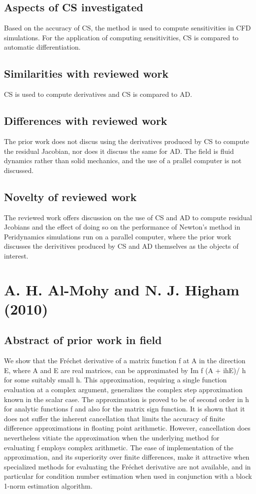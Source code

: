 \documentclass[10pt,letterpaper,draft]{article}
\begin{document}
\subsection{Aspects of CS investigated}
Based on the accuracy of CS, the method is used to compute sensitivities in CFD
simulations. For the application of computing sensitivities, CS is compared to 
automatic differentiation.

\subsection{Similarities with reviewed work}
CS is used to compute derivatives and CS is compared to AD.

\subsection{Differences with reviewed work}
The prior work does not discus using the derivatives produced by CS to compute
the residual Jacobian, nor does it discuss the same for AD. The field is
fluid dynamics rather than solid mechanics, and the use of a prallel computer
is not discussed.

\subsection{Novelty of reviewed work}

The reviewed work offers discussion on the use of CS and AD to compute
residual Jcobians and the effect of doing so on the performance of Newton's
method in Peridynamics simulations run on a parallel computer, where the prior
work discusses the derivitives produced by CS and AD themselves as the objects 
of interest.

\section{A. H. Al-Mohy and N. J. Higham (2010)}
\subsection{Abstract of prior work in field}

We show that the Fréchet derivative of a matrix function f at A in the
direction E, where A and E are real matrices, can be approximated by Im f (A +
ihE)/ h for some suitably small h. This approximation, requiring a single
function evaluation at a complex argument, generalizes the complex step
approximation known in the scalar case. The approximation is proved to be of
second order in h for analytic functions f and also for the matrix sign
function. It is shown that it does not suffer the inherent cancellation that
limits the accuracy of finite difference approximations in floating point
arithmetic. However, cancellation does nevertheless vitiate the approximation
when the underlying method for evaluating f employs complex arithmetic.  The
ease of implementation of the approximation, and its superiority over finite
differences, make it attractive when specialized methods for evaluating the
Fréchet derivative are not available, and in particular for condition number
estimation when used in conjunction with a block 1-norm estimation algorithm.
\end{document}
